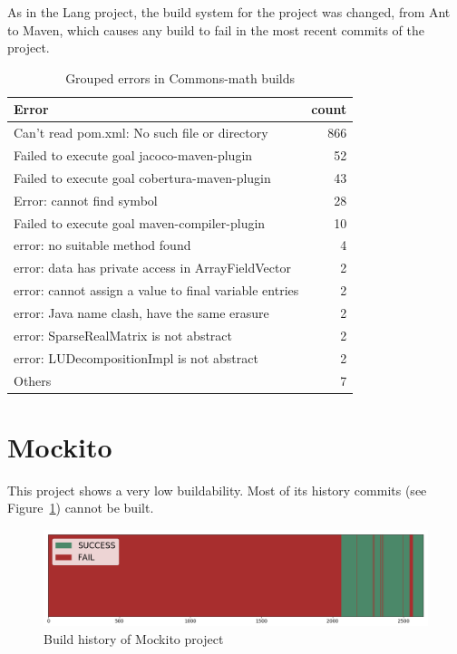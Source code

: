 As in the Lang project, the build system for the project was changed, from Ant to Maven, which causes any build to fail in the most recent commits of the project.

\begin{table}[h]
	\caption{Grouped errors in Commons-math builds}
	\label{table:mathErrors}
	\begin{center}
	\begin{tabular}{lr}
		\toprule
		\bf{Error} & \bf{count} \\ 
		\midrule
		Can't read pom.xml: No such file or directory & 866 \\
		Failed to execute goal jacoco-maven-plugin & 52 \\
		Failed to execute goal cobertura-maven-plugin & 43 \\
		Error: cannot find symbol & 28 \\
		Failed to execute goal maven-compiler-plugin & 10 \\
		error: no suitable method found & 4 \\
		error: data has private access in ArrayFieldVector & 2 \\
		error: cannot assign a value to final variable entries & 2 \\
		error: Java name clash, have the same erasure & 2 \\
		error: SparseRealMatrix is not abstract & 2 \\
		error: LUDecompositionImpl is not abstract & 2 \\
		Others & 7 \\
		\bottomrule
	\end{tabular}
	\end{center}
\end{table}

\section{Mockito}

This project shows a very low buildability.
Most of its history commits (see Figure~\ref{fig:mockitoHist}) cannot be built.

\begin{figure}[h]
	\begin{center}
		\includegraphics[width=\linewidth]{charts/MockitoHist}
		\caption{Build history of Mockito project}
		\label{fig:mockitoHist}
	\end{center}
\end{figure}

